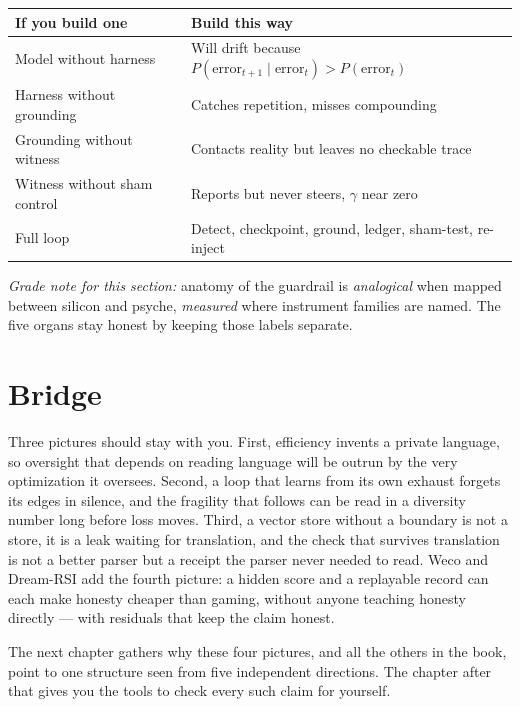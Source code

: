 \begin{center}
\small
\begin{tabular}{p{5.0cm}p{7.8cm}}
\toprule
If you build one & Build this way \\
\midrule
Model without harness & Will drift because $P(\text{error}_{t+1} \mid \text{error}_t) > P(\text{error}_t)$ \\
Harness without grounding & Catches repetition, misses compounding \\
Grounding without witness & Contacts reality but leaves no checkable trace \\
Witness without sham control & Reports but never steers, $\gamma$ near zero \\
Full loop & Detect, checkpoint, ground, ledger, sham-test, re-inject \\
\bottomrule
\end{tabular}
\end{center}

\textit{Grade note for this section:} anatomy of the guardrail is \textit{analogical} when mapped between silicon and psyche, \textit{measured} where instrument families are named. The five organs stay honest by keeping those labels separate.

\section{Bridge}
\label{sec:ch09-bridge}

Three pictures should stay with you. First, efficiency invents a private language, so oversight that depends on reading language will be outrun by the very optimization it oversees. Second, a loop that learns from its own exhaust forgets its edges in silence, and the fragility that follows can be read in a diversity number long before loss moves. Third, a vector store without a boundary is not a store, it is a leak waiting for translation, and the check that survives translation is not a better parser but a receipt the parser never needed to read. Weco and Dream-RSI add the fourth picture: a hidden score and a replayable record can each make honesty cheaper than gaming, without anyone teaching honesty directly --- with residuals that keep the claim honest.

The next chapter gathers why these four pictures, and all the others in the book, point to one structure seen from five independent directions. The chapter after that gives you the tools to check every such claim for yourself.

